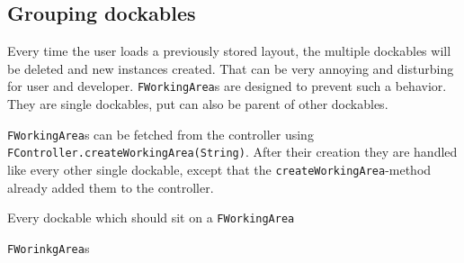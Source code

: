 \documentclass[a4paper,10pt]{article}
\newcommand{\src}[1]{\lstinline[basicstyle=\ttfamily]|#1|}
\begin{document}
\subsection{Grouping dockables}
Every time the user loads a previously stored layout, the multiple dockables will be deleted and new instances created. That can be very annoying and disturbing for user and developer. \src{FWorkingArea}s are designed to prevent such a behavior. They are single dockables, put can also be parent of other dockables.

\src{FWorkingArea}s can be fetched from the controller using \src{FController.createWorkingArea(String)}. After their creation they are handled like every other single dockable, except that the \src{createWorkingArea}-method already added them to the controller.

Every dockable which should sit on a \src{FWorkingArea}

\src{FWorinkgArea}s 
\end{document}
